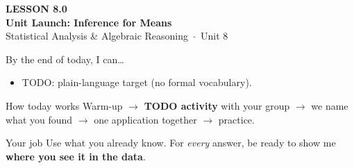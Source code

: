 \documentclass[aspectratio=169, 11pt]{beamer}
\begin{document}
{
\begin{frame}[plain]
  \vspace{2.8cm}\hspace{0.55cm}%
  \begin{minipage}{0.9\textwidth}
    {\color{goldacc}\bfseries\small LESSON 8.0}\\[0.5cm]
    {\color{white}\bfseries\LARGE Unit Launch: Inference for Means}\\[1.2cm]
    {\color{frostmid}\small Statistical Analysis \& Algebraic Reasoning~$\cdot$~Unit 8}
  \end{minipage}
\end{frame}
}

\newcommand{\redink}[1]{{\color{redacc}\bfseries #1}}

\begin{frame}[t, plain]
  By the end of today, I can\ldots
  \begin{itemize}\setlength{\itemsep}{6pt}
    \item TODO: plain-language target (no formal vocabulary).
  \end{itemize}
  \begin{block}{How today works}
    Warm-up $\to$ \textbf{TODO activity} with your group $\to$ we name what you found $\to$
    one application together $\to$ practice.
  \end{block}
\end{frame}

\begin{frame}[t, plain]
\end{frame}

\begin{frame}[t, plain]
  \begin{block}{Your job}
    Use what you already know. For \emph{every} answer, be ready to show me
    \textbf{where you see it in the data}.
  \end{block}
\end{frame}
\end{document}
